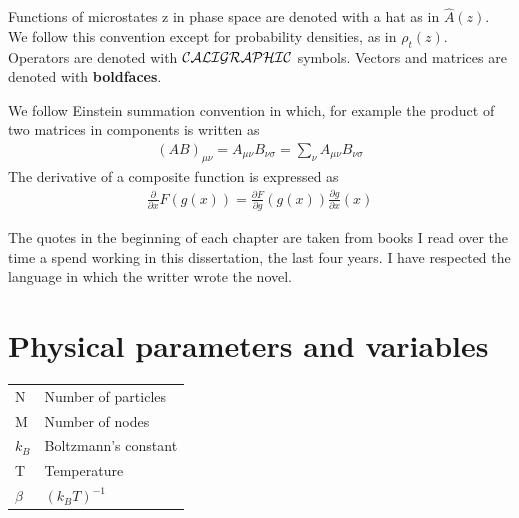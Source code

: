 \documentclass[a4paper,openright,12pt]{book}
\begin{document}
Functions of microstates z in phase space are denoted with a hat as in $\hat{A}(z)$. We follow this convention except for probability densities, as in $\rho_t(z)$. Operators are denoted with ${\cal CALIGRAPHIC}$ symbols. Vectors and matrices are denoted with {\bf boldfaces}.


We follow Einstein summation convention in which, for example the product of two matrices in components is written as
\begin{align}
    (AB)_{\mu\nu} = A_{\mu\nu}B_{\nu\sigma}=\sum_{\nu}A_{\mu\nu}B_{\nu\sigma}
\end{align}
The derivative of a composite function is expressed as
\begin{align}
    \frac{\partial}{\partial x}F(g(x))=\frac{\partial F}{\partial g}(g(x))\frac{\partial g}{\partial x}(x)
\end{align}


The quotes in the beginning of each chapter are taken from books I read over the time a spend working in this dissertation, the last four years. I have respected the language in which the writter wrote the novel. 


\section*{Physical parameters and variables}
\begin{tabular}{l l}
    N & Number of particles \\
    M & Number of nodes \\
    $k_B$ & Boltzmann's constant \\
    T & Temperature \\
    $\beta$ & $(k_BT)^{-1}$ \\
\end{tabular}
\end{document}
